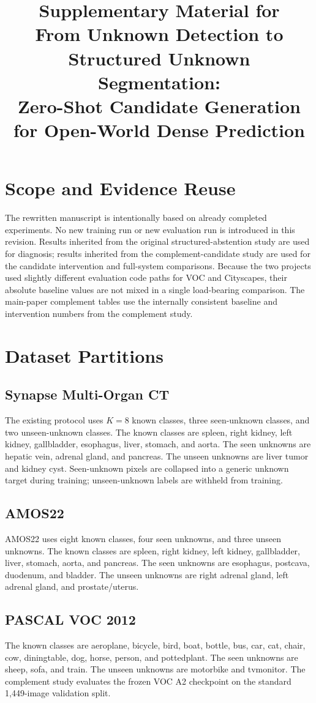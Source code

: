 \documentclass[11pt]{article}
\title{Supplementary Material for\\From Unknown Detection to Structured Unknown Segmentation:\\Zero-Shot Candidate Generation for Open-World Dense Prediction}
\author{}
\date{}
\begin{document}
\maketitle

\section{Scope and Evidence Reuse}
The rewritten manuscript is intentionally based on already completed experiments. No new training run or new evaluation run is introduced in this revision. Results inherited from the original structured-abstention study are used for diagnosis; results inherited from the complement-candidate study are used for the candidate intervention and full-system comparisons. Because the two projects used slightly different evaluation code paths for VOC and Cityscapes, their absolute baseline values are not mixed in a single load-bearing comparison. The main-paper complement tables use the internally consistent baseline and intervention numbers from the complement study.

\section{Dataset Partitions}
\subsection{Synapse Multi-Organ CT}
The existing protocol uses $K=8$ known classes, three seen-unknown classes, and two unseen-unknown classes. The known classes are spleen, right kidney, left kidney, gallbladder, esophagus, liver, stomach, and aorta. The seen unknowns are hepatic vein, adrenal gland, and pancreas. The unseen unknowns are liver tumor and kidney cyst. Seen-unknown pixels are collapsed into a generic unknown target during training; unseen-unknown labels are withheld from training.

\subsection{AMOS22}
AMOS22 uses eight known classes, four seen unknowns, and three unseen unknowns. The known classes are spleen, right kidney, left kidney, gallbladder, liver, stomach, aorta, and pancreas. The seen unknowns are esophagus, postcava, duodenum, and bladder. The unseen unknowns are right adrenal gland, left adrenal gland, and prostate/uterus.

\subsection{PASCAL VOC 2012}
The known classes are aeroplane, bicycle, bird, boat, bottle, bus, car, cat, chair, cow, diningtable, dog, horse, person, and pottedplant. The seen unknowns are sheep, sofa, and train. The unseen unknowns are motorbike and tvmonitor. The complement study evaluates the frozen VOC A2 checkpoint on the standard 1,449-image validation split.
\end{document}
